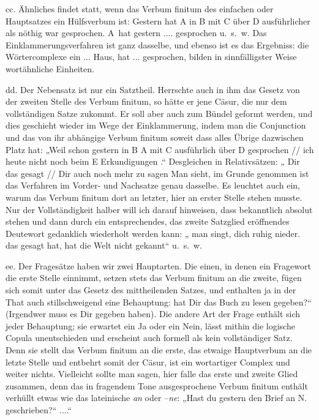 \largerpage
cc. Ähnliches findet statt, wenn das Verbum finitum des einfachen oder Hauptsatzes ein Hülfsverbum ist: Gestern hat A in B mit C über D ausführlicher als nöthig war gesprochen. A~hat gestern .... gesprochen u.~s.~w. Das Einklammerungsverfahren ist ganz dasselbe, und ebenso ist es das Ergebniss: die Wörtercomplexe ein ... Haus, hat ... gesprochen, bilden in sinnfälligster Weise wortähnliche Einheiten.

dd. Der Nebensatz ist nur ein Satztheil. Herrschte auch in ihm das Gesetz von der zweiten Stelle des Verbum finitum, so hätte er jene Cäsur, die nur dem vollständigen Satze zukommt. Er soll aber auch zum Bündel geformt werden, und dies geschieht wieder im Wege der Einklammerung, indem man die Conjunction und das von ihr abhängige Verbum finitum soweit  dass alles Übrige dazwischen Platz hat: „Weil schon gestern in B A mit C ausführlich über D gesprochen  //  ich heute nicht noch beim E Erkundigungen .“ Desgleichen in Relativsätzen: „ Dir das gesagt  //  Dir auch noch mehr zu sagen  Man sieht, im Grunde genommen ist das Verfahren im Vorder- und Nachsatze genau dasselbe. Es leuchtet auch ein, warum das Verbum finitum dort an letzter, hier an erster Stelle stehen musste. Nur der Vollständigkeit halber will ich darauf hinweisen, dass bekanntlich  absolut stehen und dann durch ein entsprechendes, das zweite Satzglied eröffnendes Deutewort gedanklich wiederholt werden kann: „ man singt,   dich ruhig nieder.  das gesagt hat,  hat die Welt nicht gekannt“ u.~s.~w.

ee. Der Fragesätze haben wir zwei Hauptarten. Die einen, in denen ein Fragewort die erste Stelle einnimmt, setzen stets das Verbum finitum an die zweite, fügen sich somit unter das Gesetz des mittheilenden Satzes, und enthalten ja in der That auch stillschweigend eine Behauptung:  hat Dir das Buch zu lesen gegeben?“ (Irgendwer muss es Dir gegeben haben). Die andere Art der Frage enthält sich jeder Behauptung; sie erwartet ein Ja oder ein Nein, lässt mithin die logische Copula unentschieden und erscheint auch formell als kein vollständiger Satz. Denn sie stellt das Verbum finitum an die erste, das etwaige Haupt\label{fp.450}verbum an die letzte Stelle und entbehrt somit der Cäsur, ist ein \label{sp.469} wortartiger Complex und weiter nichts. Vielleicht sollte man sagen, hier falle das erste und zweite Glied zusammen, denn das in fragendem Tone ausgesprochene Verbum finitum enthält verhüllt etwas wie das lateinische \textit{an} oder –\textit{ne}: „Hast du gestern den Brief an N. geschrieben?“  ....“

